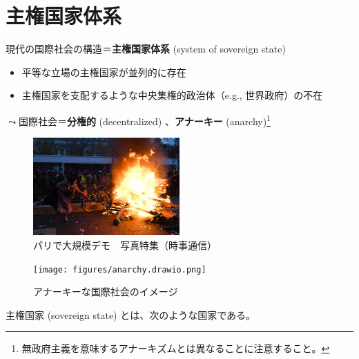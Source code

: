 \documentclass[
  xelatex,
  ja=standard]{bxjsarticle}
\providecommand{\tightlist}{%
  \setlength{\itemsep}{0pt}\setlength{\parskip}{0pt}}\usepackage{longtable,booktabs,array}
\begin{document}
\hypertarget{ux4e3bux6a29ux56fdux5bb6ux4f53ux7cfb}{%
\section{主権国家体系}\label{ux4e3bux6a29ux56fdux5bb6ux4f53ux7cfb}}

現代の国際社会の構造＝\textbf{主権国家体系} (system of sovereign state)

\begin{itemize}
\tightlist
\item
  平等な立場の主権国家が並列的に存在
\item
  主権国家を支配するような中央集権的政治体（e.g., 世界政府）の不在
\end{itemize}

\(\leadsto\)国際社会＝\textbf{分権的} (decentralized)
、\textbf{アナーキー} (anarchy)\footnote{無政府主義を意味するアナーキズムとは異なることに注意すること。}

\begin{figure}[htpb]

{\centering \includegraphics[width=0.5\textwidth,height=\textheight]{international_society_files/mediabag/pmb805-jpp033367028.jpg}

}

\caption{パリで大規模デモ　写真特集（時事通信）}

\end{figure}

\begin{figure}[htpb]

{\centering \texttt{[image: figures/anarchy.drawio.png]}

}

\caption{アナーキーな国際社会のイメージ}

\end{figure}

主権国家 (sovereign state) とは、次のような国家である。
\end{document}
